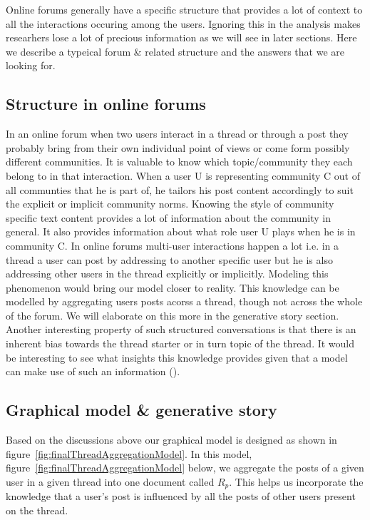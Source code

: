 Online forums generally have a specific structure that provides a lot of
context to all the interactions occuring among the users. Ignoring this in the
analysis makes researhers lose a lot of precious information as we will see in
later sections.
Here we describe a typeical forum \& related structure and the answers that we
are looking for.

\subsection{Structure in online forums}
In an online forum when two users interact in a thread or through a post
they probably bring from their own individual point of views or come
form possibly different communities.
It is valuable to know which topic/community they each belong to in that
interaction. When a user U is representing community C out of all communties
that he is part of, he tailors his post content accordingly to suit the
explicit or implicit community norms. Knowing the style of community
specific text content provides a lot of information about the community in general. 
It also provides information about what role user U plays when he is in community
C. In online forums multi-user interactions happen a lot i.e.
in a thread a user can post by addressing to another specific user but he is
also addressing other users in the thread explicitly or implicitly. Modeling
this phenomenon would bring our model closer to reality. This knowledge 
can be modelled by aggregating
users posts acorss a thread, though not across the whole of the forum. We will
elaborate on this more in the generative story section.
Another interesting property of such structured conversations is that there is 
an inherent bias towards the thread starter or in turn topic of the thread. 
It would be interesting to see what 
insights this knowledge provides given that a model can make use of such an
information ().


\subsection{Graphical model \& generative story}
Based on the discussions above our graphical model is designed as shown
in figure~\ref{fig:finalThreadAggregationModel}. In this model,
figure~\ref{fig:finalThreadAggregationModel} below, we aggregate the posts of 
a given user in a given thread into one document called $R_p$. This helps us
incorporate the knowledge that a user's post is influenced by all the posts of
other users present on the thread.

